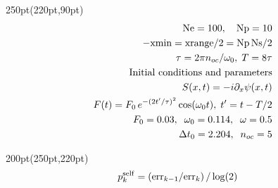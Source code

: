 \begin{frame}
\begin{textblock*}{250pt}(220pt,90pt)
	\begin{align}
      {\rm Ne} = 100,\hspace{10pt} {\rm Np}  = 10   &\nonumber\\
		-{\rm xmin} = {\rm xrange}/2  = {\rm Np\, Ns}/2  &\nonumber\\
\tau = 2\pi n_{oc}/\omega_0,\;T=8\tau  &\nonumber\\\vspace{10pt}
	  \mbox{Initial conditions and parameters}  &\nonumber\\
		    S(x,t) = -i\partial_x\psi(x,t)  &\nonumber\\
F(t) = F_0\,e^{-(2t^\prime/\tau)^2}\cos(\omega_0 t), \;
t^\prime = t - T/2
		&\nonumber\\
      F_0 = 0.03,\;\;\omega_0=0.114,\;\;\omega= 0.5 \nonumber\\
    \Delta t_0 = 2.204,\;\;n_{oc}=5 \nonumber
         \end{align}
\end{textblock*}
\begin{textblock*}{200pt}(250pt,220pt)
	\begin{align}
	p_k^{\rm self} & = \left({\rm err}_{k-1}/{\rm err}_{k}\right)/\log(2) \nonumber
	\end{align}

\end{textblock*}


\end{frame}



